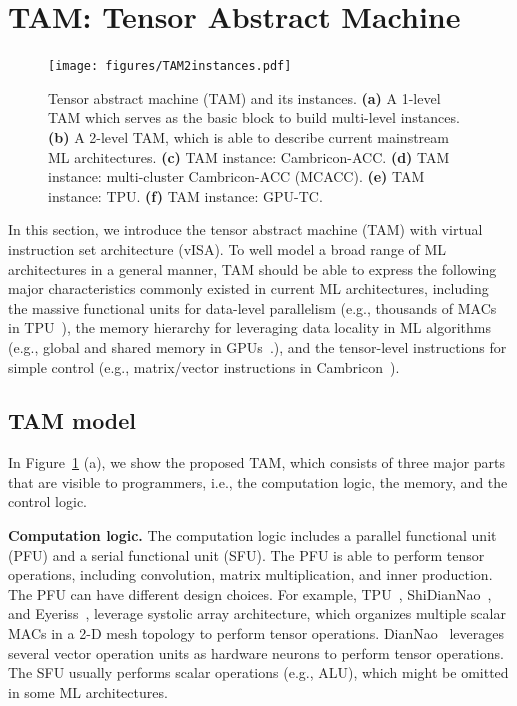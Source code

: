 \section{TAM: Tensor Abstract Machine}\label{sec:mlam}

\begin{figure}[t]
  \centering
\texttt{[image: figures/TAM2instances.pdf]}
\vspace{-10pt}
\caption{\footnotesize Tensor abstract machine (TAM) and its instances. \textbf{(a)} A 1-level
  TAM which serves as the basic block to build multi-level
  instances.\textbf{(b)} A 2-level TAM, which is able to describe
  current mainstream ML architectures. \textbf{(c)} TAM instance:
  Cambricon-ACC. \textbf{(d)} TAM instance: multi-cluster
  Cambricon-ACC (MCACC). \textbf{(e)} TAM instance: TPU. \textbf{(f)} TAM instance:
  GPU-TC.}
\label{fig:vm}
\vspace{-12pt}
\end{figure}


In this section, we introduce the tensor abstract machine (TAM) with virtual
instruction set architecture (vISA). To well model a broad range of ML architectures
in a general manner, TAM should be able to express the following major characteristics
commonly existed in current ML architectures, including the massive
functional units for data-level parallelism (e.g., thousands of MACs in
TPU~\cite{jouppi2017datacenter}), the memory hierarchy for leveraging data
locality in ML algorithms (e.g., global and shared memory in GPUs~\cite{ghorpade2012gpgpu}.),
and the tensor-level instructions for simple control (e.g., matrix/vector
instructions in Cambricon~\cite{liu2016cambricon}).


\subsection{TAM model}
In Figure~\ref{fig:vm} (a), we show the proposed TAM, which consists of three
major parts that are visible to programmers, i.e., the computation logic, the
memory, and the control logic.

\textbf{Computation logic.} The computation logic includes a
parallel functional unit (PFU) and a serial functional unit (SFU). The PFU is
able to perform tensor operations, including convolution, matrix multiplication,
and inner production. The PFU can have different design choices. For example,
TPU~\cite{jouppi2017datacenter}, ShiDianNao~\cite{du2015shidiannao}, and Eyeriss~\cite{chen2016eyeriss},
leverage systolic array architecture, which organizes multiple scalar
MACs in a 2-D mesh topology to perform tensor
operations. DianNao~\cite{chen2014diannao} leverages several vector operation units as hardware
neurons to perform tensor operations. The SFU usually performs scalar operations (e.g.,
ALU), which might be omitted in some ML architectures.

